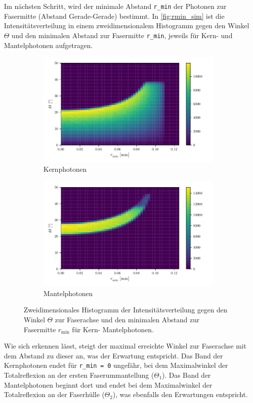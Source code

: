 Im nächsten Schritt, wird der minimale Abstand \texttt{r\_min} der Photonen zur Fasermitte (Abstand Gerade-Gerade) bestimmt.
In \autoref{fig:rmin_sim} ist die Intensitätsverteilung in einem zweidimensionalem Histogramm gegen den Winkel $\Theta$ und den minimalen Abstand zur Fasermitte \texttt{r\_min},
jeweils für Kern- und Mantelphotonen aufgetragen.
\begin{figure}
  \centering
  \begin{subfigure}{0.45\textwidth}
    \includegraphics[width = 1.2\textwidth]{content/pics/rmin_sim_core.pdf}
    \caption{Kernphotonen}
    \label{fig:rmin_sim_core}
  \end{subfigure}
  \hfill
  \begin{subfigure}{0.45\textwidth}
    \includegraphics[width = 1.2\textwidth]{content/pics/rmin_sim_cladding.pdf}
    \caption{Mantelphotonen}
    \label{fig:rmin_sim_cladding}
  \end{subfigure}
  \caption{Zweidimensionales Histogramm der Intensitätsverteilung gegen den Winkel $\Theta$ zur Faserachse und den minimalen Abstand zur Fasermitte $r_\text{min}$ für Kern-
  Mantelphotonen.}
  \label{fig:rmin_sim}
\end{figure}
Wie sich erkennen lässt, steigt der maximal erreichte Winkel zur Faserachse mit dem Abstand zu dieser an, was der Erwartung entspricht.
Das Band der Kernphotonen endet für \texttt{r\_min = 0} ungefähr, bei dem Maximalwinkel der Totalreflexion an der ersten Faserummantellung ($\Theta_1$). Das Band der 
Mantelphotonen beginnt dort und endet bei dem Maximalwinkel der Totalreflexion an der Faserhülle ($\Theta_2$), was ebenfalls den Erwartungen entspricht.


